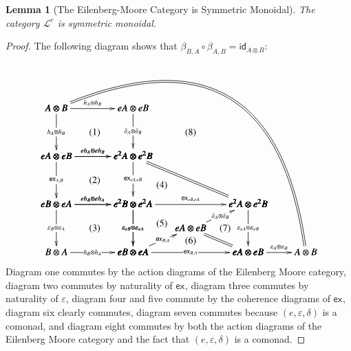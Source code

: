 \documentclass{article}
\newtheorem{lemma}[theorem]{Lemma}
\newcommand{\cat}[1]{\mathcal{#1}}
\newcommand{\id}[0]{\mathsf{id}}
\newcommand{\e}[1]{\mathsf{ex}_{#1}}
\begin{document}
\begin{lemma}[The Eilenberg-Moore Category is Symmetric Monoidal]
  \label{lemma:the_eilenberg-moore_category_is_symmetric_monoidal}
  The category $\cat{L}^e$ is symmetric monoidal.
\end{lemma}
\begin{proof}
  The following diagram shows that $\beta_{B,A} \circ \beta_{A,B} = \id_{A \otimes B}$:
  \[
  \bfig
  \square|amma|<800,500>[
    A \otimes B`
    eA \otimes eB`
    eA \otimes eB`
    e^2A \otimes e^2 B;
    h_A \otimes h_B`
    h_A \otimes h_B`
    \delta_A \otimes \delta_B`
    eh_A \otimes eh_B]

  \square(0,-500)|amma|<800,500>[
    eA \otimes eB`
    e^2A \otimes e^2B`
    eB \otimes eA`
    e^2B \otimes e^2A;
    eh_A \otimes eh_B`
    \e{A,B}`
    \e{eA,eB}`
    eh_B \otimes eh_A]

  \square(0,-1000)|ammm|<800,500>[
    eB \otimes eA`
    e^2B \otimes e^2A`
    B \otimes A`
    eB \otimes eA;
    eh_B \otimes eh_A`
    \varepsilon_B \otimes \varepsilon_A`
    \varepsilon_{eB} \otimes \varepsilon_{eA}`
    h_B \otimes h_A]

  \square(800,-1000)|ammm|<1200,500>[
    e^2B \otimes e^2A`
    e^2A \otimes e^2B`
    eB \otimes eA`
    eA \otimes eB;
    \e{eB,eA}`
    \varepsilon_{eB} \otimes \varepsilon_{eA}`
    \varepsilon_{eA} \otimes \varepsilon_{eB}`
    \e{B,A}]

  \Atriangle(800,-1000)|mmm|/<-`=`/<600,250>[
    eA \otimes eB`
    eB \otimes eA`
    eA \otimes eB;
    \e{B,A}``]

  \morphism(1400,-750)|m|<600,250>[
    eA \otimes eB`
    e^2A \otimes e^2B;
    \delta_A \otimes \delta_B]

  \btriangle(800,-500)|mmm|/`=`/<1200,500>[
    e^2A \otimes e^2B`
    e^2B \otimes e^2A`
    e^2A \otimes e^2B;``]

  \morphism(2000,-1000)<600,0>[
    eA \otimes eB`
    A \otimes B;
    \varepsilon_A \otimes \varepsilon_B]

  \morphism(0,500)/{@{=}@/^10em/}/<2600,-1500>[
    A \otimes B`
    A \otimes B;]

  \place(400,250)[(1)]
  \place(400,-250)[(2)]
  \place(400,-750)[(3)]
  \place(1100,-300)[(4)]
  \place(1100,-700)[(5)]
  \place(1400,-880)[(6)]
  \place(1760,-750)[(7)]
  \place(1400,250)[(8)]
  \efig
  \]
  Diagram one commutes by the action diagrams of the Eilenberg Moore
  category, diagram two commutes by naturality of $\e{}$, diagram
  three commutes by naturality of $\varepsilon$, diagram four and five
  commute by the coherence diagrams of $\e{}$, diagram six clearly
  commutes, diagram seven commutes because $(e,\varepsilon,\delta)$ is
  a comonad, and diagram eight commutes by both the action diagrams of
  the Eilenberg Moore category and the fact that
  $(e,\varepsilon,\delta)$ is a comonad.
  

\end{proof}
\end{document}
